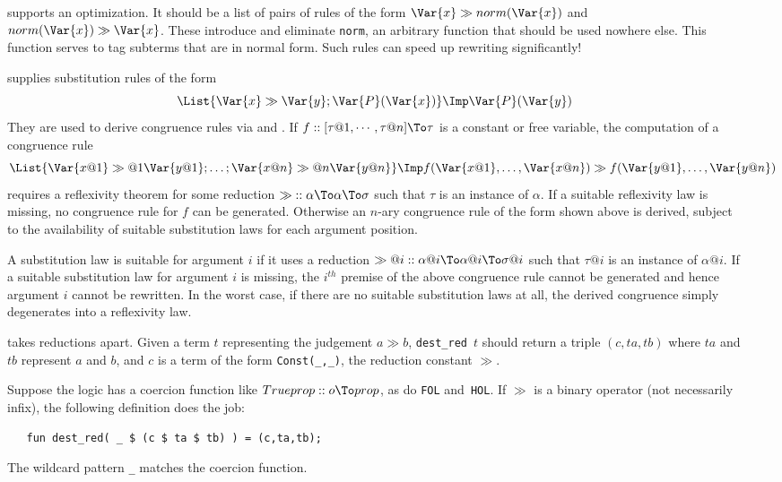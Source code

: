 \begin{description}
\item[] 
supports an optimization.  It should be a list of pairs of rules of the
form $\Var{x} \gg norm(\Var{x})$ and $norm(\Var{x}) \gg \Var{x}$.  These
introduce and eliminate {\tt norm}, an arbitrary function that should be
used nowhere else.  This function serves to tag subterms that are in normal
form.  Such rules can speed up rewriting significantly!

\item[] 
supplies substitution rules of the form
\[ \List{\Var{x} \gg \Var{y}; \Var{P}(\Var{x})} \Imp \Var{P}(\Var{y}) \]
They are used to derive congruence rules via  and
.  If $f :: [\tau@1,\cdots,\tau@n]\To\tau$ is a
constant or free variable, the computation of a congruence rule
\[\List{\Var{x@1} \gg@1 \Var{y@1}; \ldots; \Var{x@n} \gg@n \Var{y@n}}
\Imp f(\Var{x@1},\ldots,\Var{x@n}) \gg f(\Var{y@1},\ldots,\Var{y@n}) \]
requires a reflexivity theorem for some reduction ${\gg} ::
\alpha\To\alpha\To\sigma$ such that $\tau$ is an instance of $\alpha$.  If a
suitable reflexivity law is missing, no congruence rule for $f$ can be
generated.   Otherwise an $n$-ary congruence rule of the form shown above is
derived, subject to the availability of suitable substitution laws for each
argument position.  

A substitution law is suitable for argument $i$ if it
uses a reduction ${\gg@i} :: \alpha@i\To\alpha@i\To\sigma@i$ such that
$\tau@i$ is an instance of $\alpha@i$.  If a suitable substitution law for
argument $i$ is missing, the $i^{th}$ premise of the above congruence rule
cannot be generated and hence argument $i$ cannot be rewritten.  In the
worst case, if there are no suitable substitution laws at all, the derived
congruence simply degenerates into a reflexivity law.

\item[] 
takes reductions apart.  Given a term $t$ representing the judgement
\mbox{$a \gg b$}, \verb$dest_red$~$t$ should return a triple $(c,ta,tb)$
where $ta$ and $tb$ represent $a$ and $b$, and $c$ is a term of the form
\verb$Const(_,_)$, the reduction constant $\gg$.  

Suppose the logic has a coercion function like $Trueprop::o\To prop$, as do
{\tt FOL} and~{\tt HOL}\@.  If $\gg$ is a binary operator (not necessarily
infix), the following definition does the job:
\begin{verbatim}
   fun dest_red( _ $ (c $ ta $ tb) ) = (c,ta,tb);
\end{verbatim}
The wildcard pattern {\tt_} matches the coercion function.
\end{description}


